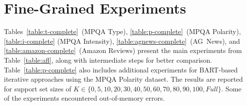 \documentclass[11pt]{article}
\theoremstyle{definition}
\begin{document}
\section{Fine-Grained Experiments}
\label{appendix:complete}

Tables~\ref{table:t-complete}~(MPQA Type), \ref{table:p-complete}~(MPQA Polarity), \ref{table:i-complete} (MPQA Intensity), \ref{table:agnews-complete}~(AG~News), and \ref{table:amazon-complete}~(Amazon Reviews) present the main experiments from Table~\ref{table:afl}, along with intermediate steps for better comparison. Table~\ref{table:p-complete} also includes additional experiments for BART-based iterative approaches using the MPQA Polarity dataset. The results are reported for support set sizes of $K \in \{0, 5, 10, 20, 30, 40, 50, 60, 70, 80, 90, 100, Full\}$. Some of the experiments encountered out-of-memory errors.
\end{document}
